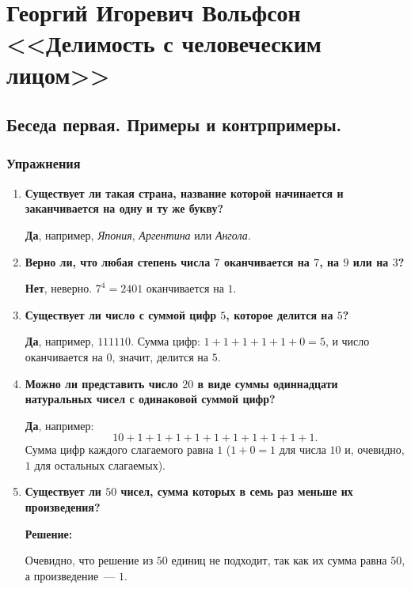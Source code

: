 \documentclass[12pt, a4paper]{article}
\begin{document}
\section*{Георгий Игоревич Вольфсон <<Делимость с человеческим лицом>>}

\subsection*{Беседа первая. Примеры и контрпримеры.}

\subsubsection*{Упражнения}

\begin{enumerate}[label=\arabic*., wide=0pt, leftmargin=*]
    \item \textbf{Существует ли такая страна, название которой начинается и заканчивается на одну и ту же букву?}

    \textbf{Да}, например, \emph{Япония}, \emph{Аргентина} или \emph{Ангола}.

    \item \textbf{Верно ли, что любая степень числа $7$ оканчивается на $7$, на $9$ или на $3$?}

    \textbf{Нет}, неверно. $7^4 = 2401$ оканчивается на $1$.

    \item \textbf{Существует ли число с суммой цифр $5$, которое делится на $5$?}

    \textbf{Да}, например, $111110$. Сумма цифр: $1+1+1+1+1+0=5$, и число оканчивается на $0$, значит, делится на $5$.

    \item \textbf{Можно ли представить число $20$ в виде суммы одиннадцати натуральных чисел с одинаковой суммой цифр?}

    \textbf{Да}, например:
    \[
    10 + 1 + 1 + 1 + 1 + 1 + 1 + 1 + 1 + 1 + 1.
    \]
    Сумма цифр каждого слагаемого равна $1$ ($1+0=1$ для числа $10$ и, очевидно, $1$ для остальных слагаемых).

    \item \textbf{Существует ли $50$ чисел, сумма которых в семь раз меньше их произведения?}

    \textbf{Решение:}

    Очевидно, что решение из $50$ единиц не подходит, так как их сумма равна $50$, а произведение~--- $1$.


\end{enumerate}
\end{document}
